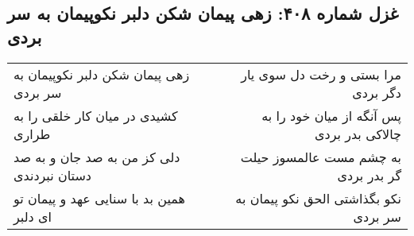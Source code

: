 \begin{center}
\section*{غزل شماره ۴۰۸: زهی پیمان شکن دلبر نکوپیمان به سر بردی}
\label{sec:408}
\begin{longtable}{l p{0.5cm} r}
زهی پیمان شکن دلبر نکوپیمان به سر بردی
&&
مرا بستی و رخت دل سوی یار دگر بردی
\\
کشیدی در میان کار خلقی را به طراری
&&
پس آنگه از میان خود را به چالاکی بدر بردی
\\
دلی کز من به صد جان و به صد دستان نبردندی
&&
به چشم مست عالمسوز حیلت گر بدر بردی
\\
همین بد با سنایی عهد و پیمان تو ای دلبر
&&
نکو بگذاشتی الحق نکو پیمان به سر بردی
\\
\end{longtable}
\end{center}
